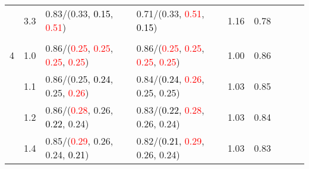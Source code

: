 \documentclass[10pt,a4paper]{report}
\begin{document}
\begin{table}[!htbp]
\begin{center}
{\begin{tabular}{ccllccccc}
				  & 3.3                               & 0.83/(0.33, \textcolor{black}{0.15}, \textcolor{red}{0.51})                                                                                                                                   & 0.71/(0.33, \textcolor{red}{0.51}, \textcolor{black}{0.15})                                                                                                                                   & 1.16             & 0.78                     \\
				  &                                   &                                                                                                                                                                                               &                                                                                                                                                                                               &                                             \\
				4 & 1.0                               & 0.86/(\textcolor{red}{0.25}, \textcolor{red}{0.25}, \textcolor{red}{0.25}, \textcolor{red}{0.25})                                                                                             & 0.86/(\textcolor{red}{0.25}, \textcolor{red}{0.25}, \textcolor{red}{0.25}, \textcolor{red}{0.25})                                                                                             & 1.00             & 0.86                     \\
				  & 1.1                               & 0.86/(0.25, \textcolor{black}{0.24}, 0.25, \textcolor{red}{0.26})                                                                                                                             & 0.84/(\textcolor{black}{0.24}, \textcolor{red}{0.26}, 0.25, 0.25)                                                                                                                             & 1.03             & 0.85                     \\
				  & 1.2                               & 0.86/(\textcolor{red}{0.28}, 0.26, \textcolor{black}{0.22}, 0.24)                                                                                                                             & 0.83/(\textcolor{black}{0.22}, \textcolor{red}{0.28}, 0.26, 0.24)                                                                                                                             & 1.03             & 0.84                     \\
				  & 1.4                               & 0.85/(\textcolor{red}{0.29}, 0.26, 0.24, \textcolor{black}{0.21})                                                                                                                             & 0.82/(\textcolor{black}{0.21}, \textcolor{red}{0.29}, 0.26, 0.24)                                                                                                                             & 1.03             & 0.83                     \\

\end{tabular}}
\end{center}
\end{table}
\end{document}

